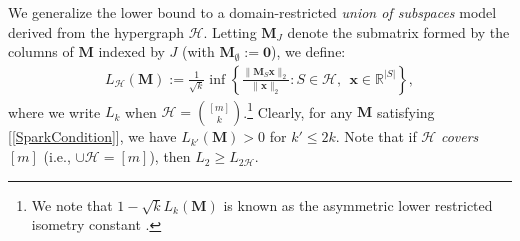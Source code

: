 \documentclass[9pt,twocolumn]{pnas-new}
\renewcommand{\eqref}[1]{\textnormal{[\ref{#1}]}}
\begin{document}
We generalize the  lower bound to a domain-restricted \emph{union of subspaces} model \cite{vidal2005generalized} derived from the hypergraph $\mathcal{H}$. Letting $\mathbf{M}_J$ denote the submatrix formed by the columns of $\mathbf{M}$ indexed by $J$ (with $\mathbf{M}_\emptyset := \mathbf{0}$), we define: 
%
\begin{align}\label{Ldef}
L_\mathcal{H}(\mathbf{M}) := \frac{1}{\sqrt{k}} \inf \left\{ \frac{\|\mathbf{M}_S\mathbf{x}\|_2}{ \|\mathbf{x}\|_2} : S \in \mathcal{H}, \ \ \mathbf{x} \in \mathbb{R}^{|S|} \right\},
\end{align} 
%
where we write $L_{k}$ when $\mathcal{H} = {[m] \choose k}$.\footnote{We note that $1 - \sqrt{k} L_k(\mathbf{M})$ is known as the asymmetric lower restricted isometry constant \cite{Blanchard2011}.} Clearly, for any $\mathbf{M}$ satisfying \eqref{SparkCondition}, we have $L_{k'}(\mathbf{M}) > 0$ for  $k' \leq 2k$. Note that if $\mathcal{H}$ \textit{covers} $[m]$ (i.e., $\cup \mathcal{H} = [m]$), then $L_2 \geq L_{2\mathcal{H}}$.
 
\end{document}

